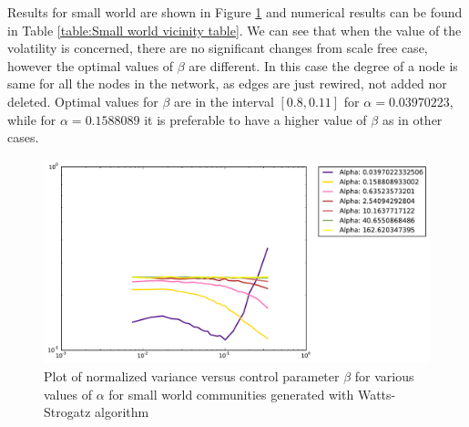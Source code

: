 Results for small world are shown in Figure \ref{fig:small world vicinity partial} and numerical results can be found in Table \ref{table:Small world vicinity table}.
We can see that when the value of the volatility is concerned, there are no significant changes from scale free case, however the optimal values of $\beta$ are different.
In this case the degree of a node is same for all the nodes in the network, as edges are just rewired, not added nor deleted.
Optimal values for $\beta$ are in the interval $[0.8,0.11]$ for $\alpha=0.03970223$, while for $\alpha=0.1588089$ it is preferable to have a higher value of $\beta$ as in other cases.

\begin{figure}[h]
\begin{center}
\includegraphics[scale=0.4]{images/results/vicinity_WattsStrogatz_n403_rounds10000_partial.pdf}
\caption{Plot of normalized variance versus control parameter $\beta$ for various values of $\alpha$  for small world communities generated with Watts-Strogatz algorithm}
\label{fig:small world vicinity partial}
\end{center}
\end{figure}

